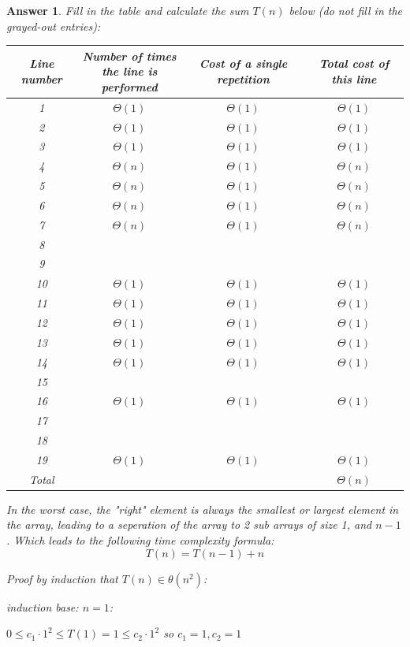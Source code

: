 \documentclass[a4paper]{article}
\theoremstyle{remarksStyle}
\theoremstyle{questionStyle}
\theoremstyle{answerStyle}
\newtheorem{answer}{Answer}
\begin{document}
\begin{answer}
    Fill in the table and calculate the sum $T(n)$ below (do not fill in the grayed-out entries):
\begin{center}    
\begin{tabular}{||c | c | c | c ||}
 \hline
 Line number & \makecell{Number of times \\ the line is performed} & Cost of a single repetition & Total cost of this line \\ [0.5ex]
 \hline\hline
 1 & $\Theta(1)$ & $\Theta(1)$ & $\Theta (1)$  \\
 \hline
 2 & $\Theta(1)$ & $\Theta(1)$ & $\Theta (1)$  \\
 \hline
 3 & $\Theta(1)$ & $\Theta(1)$ & $\Theta (1)$  \\
  \hline
 4 & $\Theta(n)$ & $\Theta(1)$ & $\Theta (n)$  \\
   \hline
 5 & $\Theta(n)$ & $\Theta(1)$ & $\Theta (n)$  \\
  \hline
 6 & $\Theta(n)$ & $\Theta(1)$ & $\Theta (n)$  \\
    \hline
 7 & $\Theta(n)$ & $\Theta(1)$ & $\Theta (n)$  \\
 \hline
 8 & \cellcolor{Gray} & \cellcolor{Gray} & \cellcolor{Gray} \\
 \hline
 9 & \cellcolor{Gray} & \cellcolor{Gray} & \cellcolor{Gray} \\
 \hline
 10 & $\Theta(1)$ & $\Theta(1)$ & $\Theta (1)$  \\
 \hline
 11 & $\Theta(1)$ & $\Theta(1)$ & $\Theta (1)$  \\
 \hline
 12 & $\Theta(1)$ & $\Theta(1)$ & $\Theta (1)$  \\
 \hline
 13 & $\Theta(1)$ & $\Theta(1)$ & $\Theta (1)$  \\
 \hline
 14 & $\Theta(1)$ & $\Theta(1)$ & $\Theta (1)$  \\
 \hline
 15 & \cellcolor{Gray} & \cellcolor{Gray} & \cellcolor{Gray} \\
 \hline
 16 & $\Theta(1)$ & $\Theta(1)$ & $\Theta (1)$  \\
 \hline
 17 & \cellcolor{Gray} & \cellcolor{Gray} & \cellcolor{Gray} \\
 \hline
 18 & \cellcolor{Gray} & \cellcolor{Gray} & \cellcolor{Gray} \\
 \hline
 19 & $\Theta(1)$ & $\Theta(1)$ & $\Theta (1)$  \\
 \hline
 Total & \cellcolor{Gray} & \cellcolor{Gray} & $\Theta (n)$  \\
 \hline
\end{tabular}
\end{center}
\item In the worst case, the "right" element is always the smallest or largest element in the array, leading to a seperation of the array to 2 sub arrays of size 1, and $n - 1$. Which leads to the following time complexity formula:
\[ T(n) = T(n-1) + n \]
\item Proof by induction that $ T(n) \in \theta(n^2)$:
\item induction base: $n = 1$:
\item $ 0 \leq c_1 \cdot 1^2 \leq T(1) = 1 \leq c_2 \cdot 1^2$ so $ c_1 = 1, c_2 = 1$


\end{answer}
\end{document}
